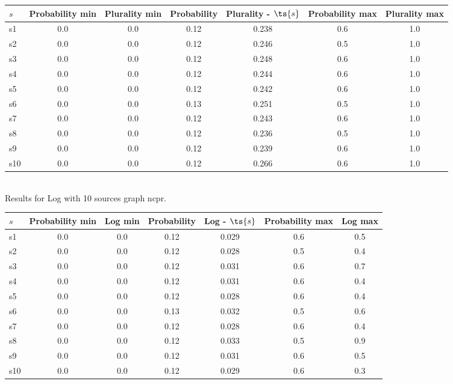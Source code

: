 \documentclass{article}
\begin{document}
\noindent\begin{tabular}{|l|c|c|c|c|c|c|}
\hline
$s$& Probability min & Plurality min & Probability & Plurality - $\ts{s}$ & Probability max & Plurality max\\
\hline
s1 &0.0 & 0.0 & 0.12 & 0.238 & 0.6 & 1.0\\
\hline
s2 &0.0 & 0.0 & 0.12 & 0.246 & 0.5 & 1.0\\
\hline
s3 &0.0 & 0.0 & 0.12 & 0.248 & 0.6 & 1.0\\
\hline
s4 &0.0 & 0.0 & 0.12 & 0.244 & 0.6 & 1.0\\
\hline
s5 &0.0 & 0.0 & 0.12 & 0.242 & 0.6 & 1.0\\
\hline
s6 &0.0 & 0.0 & 0.13 & 0.251 & 0.5 & 1.0\\
\hline
s7 &0.0 & 0.0 & 0.12 & 0.243 & 0.6 & 1.0\\
\hline
s8 &0.0 & 0.0 & 0.12 & 0.236 & 0.5 & 1.0\\
\hline
s9 &0.0 & 0.0 & 0.12 & 0.239 & 0.6 & 1.0\\
\hline
s10 &0.0 & 0.0 & 0.12 & 0.266 & 0.6 & 1.0\\
\hline
\end{tabular}\\

\noindent Results for Log with 10 sources graph ncpr.

\noindent\begin{tabular}{|l|c|c|c|c|c|c|}
\hline
$s$& Probability min & Log min & Probability & Log - $\ts{s}$ & Probability max & Log max\\
\hline
s1 &0.0 & 0.0 & 0.12 & 0.029 & 0.6 & 0.5\\
\hline
s2 &0.0 & 0.0 & 0.12 & 0.028 & 0.5 & 0.4\\
\hline
s3 &0.0 & 0.0 & 0.12 & 0.031 & 0.6 & 0.7\\
\hline
s4 &0.0 & 0.0 & 0.12 & 0.031 & 0.6 & 0.4\\
\hline
s5 &0.0 & 0.0 & 0.12 & 0.028 & 0.6 & 0.4\\
\hline
s6 &0.0 & 0.0 & 0.13 & 0.032 & 0.5 & 0.6\\
\hline
s7 &0.0 & 0.0 & 0.12 & 0.028 & 0.6 & 0.4\\
\hline
s8 &0.0 & 0.0 & 0.12 & 0.033 & 0.5 & 0.9\\
\hline
s9 &0.0 & 0.0 & 0.12 & 0.031 & 0.6 & 0.5\\
\hline
s10 &0.0 & 0.0 & 0.12 & 0.029 & 0.6 & 0.3\\
\hline
\end{tabular}\\
\end{document}
